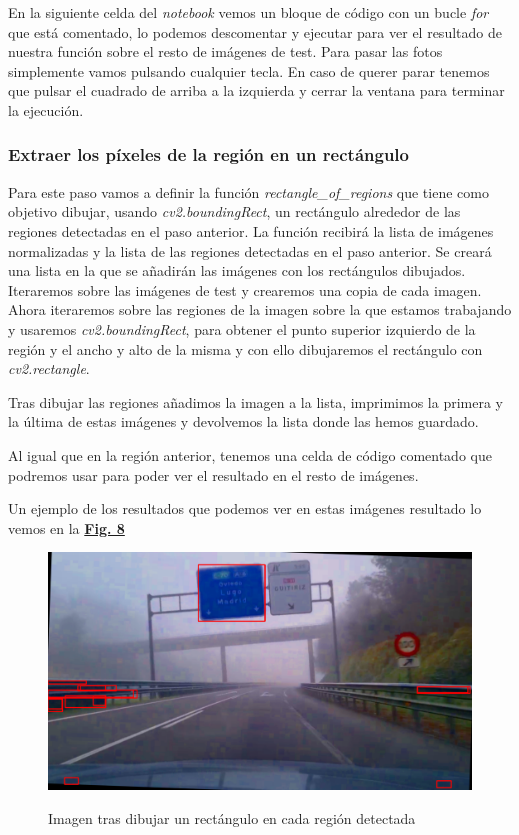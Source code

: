 \documentclass[a4paper, 12pt]{article}
\begin{document}
En la siguiente celda del \textit{notebook} vemos un bloque de código con un bucle \textit{for} que está comentado, lo podemos descomentar y ejecutar para ver el resultado de nuestra función sobre el resto de imágenes de test. Para pasar las fotos simplemente vamos pulsando cualquier tecla. En caso de querer parar tenemos que pulsar el cuadrado de arriba a la izquierda y cerrar la ventana para terminar la ejecución. 


\subsubsection{Extraer los píxeles de la región en un rectángulo}
Para este paso vamos a definir la función \textit{rectangle\_of\_regions} que tiene como objetivo dibujar, usando \textit{cv2.boundingRect}, un rectángulo alrededor de las regiones detectadas en el paso anterior. La función recibirá la lista de imágenes normalizadas y la lista de las regiones detectadas en el paso anterior.
Se creará una lista en la que se añadirán las imágenes con los rectángulos dibujados. Iteraremos sobre las imágenes de test y crearemos una copia de cada imagen. Ahora iteraremos sobre las regiones de la imagen sobre la que estamos trabajando y usaremos \textit{cv2.boundingRect}, para obtener el punto superior izquierdo de la región y el ancho y alto de la misma y con ello dibujaremos el rectángulo con \textit{cv2.rectangle}. 


Tras dibujar las regiones añadimos la imagen a la lista, imprimimos la primera y la última de estas imágenes y devolvemos la lista donde las hemos guardado. 


Al igual que en la región anterior, tenemos una celda de código comentado que podremos usar para poder ver el resultado en el resto de imágenes.

Un ejemplo de los resultados que podemos ver en estas imágenes resultado lo vemos en la \textbf{\hyperref[fig:Rectangulos]{Fig. 8}}
\begin{figure}[h]
	\centering
	\caption{Imagen tras dibujar un rectángulo en cada región detectada}\vspace{0.5cm}
	\includegraphics[width=0.6\linewidth]{img/Rectangulos}
	\label{fig:Rectangulos}
\end{figure}
\end{document}
